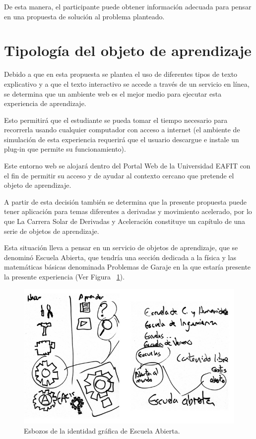 \documentclass[twoside,letterpaper,12pt]{report}
\begin{document}
De esta manera, el participante puede obtener información adecuada para pensar en una propuesta de solución al problema planteado.


\section{Tipología del objeto de aprendizaje} %
\label{sec:tipolog_a_del_objeto_de_aprendizaje}

Debido a que en esta propuesta se plantea el uso de diferentes tipos de texto explicativo y a que el texto interactivo se accede a través de un servicio en línea, se determina que un ambiente web es el mejor medio para ejecutar esta experiencia de aprendizaje.

Esto permitirá que el estudiante se pueda tomar el tiempo necesario para recorrerla usando cualquier computador con acceso a internet (el ambiente de simulación de esta experiencia requerirá que el usuario descargue e instale un plug-in que permite su funcionamiento).

Este entorno web se alojará dentro del Portal Web de la Universidad EAFIT con el fin de permitir su acceso y de ayudar al contexto cercano que pretende el objeto de aprendizaje.
 
A partir de esta decisión también se determina que la presente propuesta puede tener aplicación para temas diferentes a derivadas y movimiento acelerado, por lo que La Carrera Solar de Derivadas y Aceleración constituye un capítulo de una serie de objetos de aprendizaje. 

Esta situación lleva a pensar en un servicio de objetos de aprendizaje, que se denominó Escuela Abierta, que tendría una sección dedicada a la física y las matemáticas básicas denominada Problemas de Garaje en la que estaría presente la presente experiencia (Ver Figura ~\ref{esbozos}). 

\begin{figure}[h!]
\label{esbozos}
\includegraphics[width=1\textwidth]{aux/esbozos}\caption{Esbozos de la identidad gráfica de Escuela Abierta.}
\end{figure}
\end{document}
